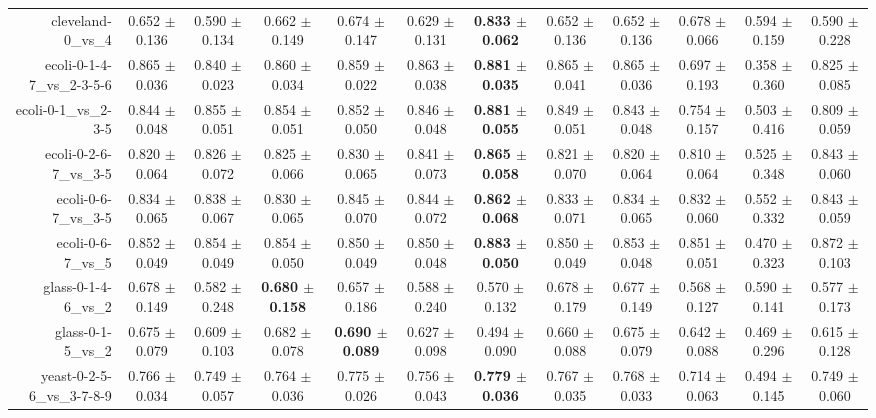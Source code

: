 \begin{table}[!ht]
{\begin{tabular}{r c c c c c c c c c c c}
cleveland-0\_vs\_4 & 0.652 $\pm$ 0.136 & 0.590 $\pm$ 0.134 & 0.662 $\pm$ 0.149 & 0.674 $\pm$ 0.147 & 0.629 $\pm$ 0.131 & \textbf{0.833 $\pm$ 0.062} & 0.652 $\pm$ 0.136 & 0.652 $\pm$ 0.136 & 0.678 $\pm$ 0.066 & 0.594 $\pm$ 0.159 & 0.590 $\pm$ 0.228 \\
ecoli-0-1-4-7\_vs\_2-3-5-6 & 0.865 $\pm$ 0.036 & 0.840 $\pm$ 0.023 & 0.860 $\pm$ 0.034 & 0.859 $\pm$ 0.022 & 0.863 $\pm$ 0.038 & \textbf{0.881 $\pm$ 0.035} & 0.865 $\pm$ 0.041 & 0.865 $\pm$ 0.036 & 0.697 $\pm$ 0.193 & 0.358 $\pm$ 0.360 & 0.825 $\pm$ 0.085 \\
ecoli-0-1\_vs\_2-3-5 & 0.844 $\pm$ 0.048 & 0.855 $\pm$ 0.051 & 0.854 $\pm$ 0.051 & 0.852 $\pm$ 0.050 & 0.846 $\pm$ 0.048 & \textbf{0.881 $\pm$ 0.055} & 0.849 $\pm$ 0.051 & 0.843 $\pm$ 0.048 & 0.754 $\pm$ 0.157 & 0.503 $\pm$ 0.416 & 0.809 $\pm$ 0.059 \\
ecoli-0-2-6-7\_vs\_3-5 & 0.820 $\pm$ 0.064 & 0.826 $\pm$ 0.072 & 0.825 $\pm$ 0.066 & 0.830 $\pm$ 0.065 & 0.841 $\pm$ 0.073 & \textbf{0.865 $\pm$ 0.058} & 0.821 $\pm$ 0.070 & 0.820 $\pm$ 0.064 & 0.810 $\pm$ 0.064 & 0.525 $\pm$ 0.348 & 0.843 $\pm$ 0.060 \\
ecoli-0-6-7\_vs\_3-5 & 0.834 $\pm$ 0.065 & 0.838 $\pm$ 0.067 & 0.830 $\pm$ 0.065 & 0.845 $\pm$ 0.070 & 0.844 $\pm$ 0.072 & \textbf{0.862 $\pm$ 0.068} & 0.833 $\pm$ 0.071 & 0.834 $\pm$ 0.065 & 0.832 $\pm$ 0.060 & 0.552 $\pm$ 0.332 & 0.843 $\pm$ 0.059 \\
ecoli-0-6-7\_vs\_5 & 0.852 $\pm$ 0.049 & 0.854 $\pm$ 0.049 & 0.854 $\pm$ 0.050 & 0.850 $\pm$ 0.049 & 0.850 $\pm$ 0.048 & \textbf{0.883 $\pm$ 0.050} & 0.850 $\pm$ 0.049 & 0.853 $\pm$ 0.048 & 0.851 $\pm$ 0.051 & 0.470 $\pm$ 0.323 & 0.872 $\pm$ 0.103 \\
glass-0-1-4-6\_vs\_2 & 0.678 $\pm$ 0.149 & 0.582 $\pm$ 0.248 & \textbf{0.680 $\pm$ 0.158} & 0.657 $\pm$ 0.186 & 0.588 $\pm$ 0.240 & 0.570 $\pm$ 0.132 & 0.678 $\pm$ 0.179 & 0.677 $\pm$ 0.149 & 0.568 $\pm$ 0.127 & 0.590 $\pm$ 0.141 & 0.577 $\pm$ 0.173 \\
glass-0-1-5\_vs\_2 & 0.675 $\pm$ 0.079 & 0.609 $\pm$ 0.103 & 0.682 $\pm$ 0.078 & \textbf{0.690 $\pm$ 0.089} & 0.627 $\pm$ 0.098 & 0.494 $\pm$ 0.090 & 0.660 $\pm$ 0.088 & 0.675 $\pm$ 0.079 & 0.642 $\pm$ 0.088 & 0.469 $\pm$ 0.296 & 0.615 $\pm$ 0.128 \\
yeast-0-2-5-6\_vs\_3-7-8-9 & 0.766 $\pm$ 0.034 & 0.749 $\pm$ 0.057 & 0.764 $\pm$ 0.036 & 0.775 $\pm$ 0.026 & 0.756 $\pm$ 0.043 & \textbf{0.779 $\pm$ 0.036} & 0.767 $\pm$ 0.035 & 0.768 $\pm$ 0.033 & 0.714 $\pm$ 0.063 & 0.494 $\pm$ 0.145 & 0.749 $\pm$ 0.060 \\

\end{tabular}}
\end{table}

